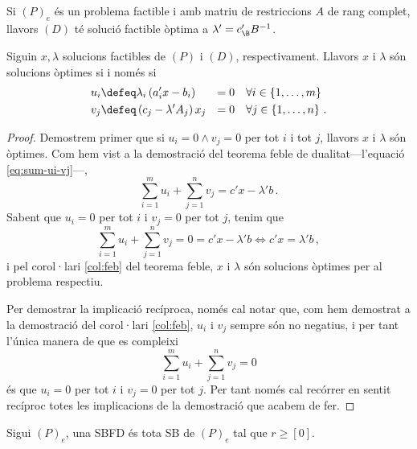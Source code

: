 \begin{col}
    Si $\left(P\right)_e$ és un problema factible i amb matriu de restriccions $A$ de rang complet, llavors $\left(D\right)$ té solució factible òptima a $\lambda' = c_\B'B^{-1}$.
\end{col}

\begin{teo}
    Siguin $x, \lambda$ solucions factibles de $\left(P\right)$ i $\left(D\right)$, respectivament. Llavors $x$ i $\lambda$ són solucions òptimes si i només si
    \begin{alignat*}{2}{}
        u_i &\defeq \lambda_i \left(a_i'x - b_i\right) &= 0 &\quad \forall i \in \left\{1, \dots, m\right\} \\
        v_j &\defeq \left(c_j - \lambda'A_j\right) x_j &= 0 &\quad \forall j \in \left\{1, \dots, n\right\}\,.
    \end{alignat*}
    \begin{proof}
    	Demostrem primer que si $u_i = 0 \land v_j = 0$ per tot $i$ i tot $j$, llavors $x$ i $\lambda$ són òptimes. Com hem vist a la demostració del teorema feble de dualitat---l'equació \eqref{eq:sum-ui-vj}---, 
    	\begin{equation*}
	    	\sum_{i = 1}^{m} u_i + \sum_{j = 1}^{n} v_j = c'x - \lambda'b\,.
    	\end{equation*}
    	Sabent que $u_i = 0$ per tot $i$ i $v_j = 0$ per tot $j$, tenim que \[\sum_{i = 1}^{m} u_i + \sum_{j = 1}^{n} v_j = 0 = c'x - \lambda'b \Leftrightarrow c'x = \lambda'b\,,  \] i pel corol·lari \ref{col:feb} del teorema feble, $x$ i $\lambda$ són solucions òptimes per al problema respectiu.
    	
    	Per demostrar la implicació recíproca, només cal notar que, com hem demostrat a la demostració del corol·lari \ref{col:feb}, $u_i$ i $v_j$ sempre són no negatius, i per tant l'única manera de que es compleixi \[\sum_{i=1}^{m} u_i + \sum_{j=1}^{n} v_j = 0 \] és que $u_i = 0$ per tot $i$ i $v_j = 0$ per tot $j$. Per tant només cal recórrer en sentit recíproc totes les implicacions de la demostració que acabem de fer.
    \end{proof}
\end{teo}

\begin{defi}
    Sigui $\left(P\right)_e$, una SBFD és tota SB de $\left(P\right)_e$ tal que $r \geq \left[0\right]$.
\end{defi}

